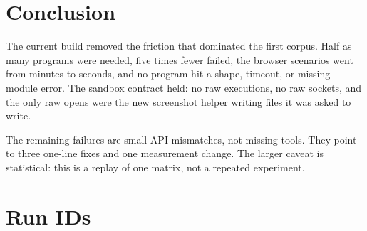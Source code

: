 \documentclass[11pt]{article}
\begin{document}
\section{Conclusion}

The current build removed the friction that dominated the first corpus. Half as
many programs were needed, five times fewer failed, the browser scenarios went
from minutes to seconds, and no program hit a shape, timeout, or missing-module
error. The sandbox contract held: no raw executions, no raw sockets, and the only
raw opens were the new screenshot helper writing files it was asked to write.

The remaining failures are small API mismatches, not missing tools. They point to
three one-line fixes and one measurement change. The larger caveat is
statistical: this is a replay of one matrix, not a repeated experiment.

\appendix
\section{Run IDs}
\label{app:runs}
\end{document}
